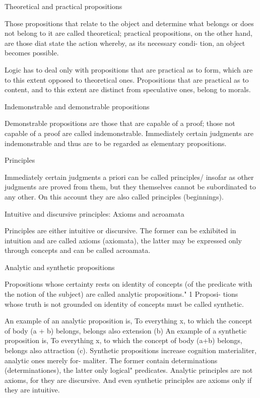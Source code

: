 Theoretical and practical propositions

Those propositions that relate to the object and determine what belongs
or does not belong to it are called theoretical; practical propositions, on the
other hand, are those diat state the action whereby, as its necessary condi-
tion, an object becomes possible.

    Logic has to deal only with propositions that are practical as to form, which
    are to this extent opposed to theoretical ones. Propositions that are practical
    as to content, and to this extent are distinct from speculative ones, belong to
    morals.

Indemonstrable and demonstrable propositions

Demonstrable propositions are those that are capable of a proof; those not
capable of a proof are called indemonstrable.
Immediately certain judgments are indemonstrable and thus are to be
regarded as elementary propositions.

Principles

Immediately certain judgments a priori can be called principles/ insofar as
other judgments are proved from them, but they themselves cannot be
subordinated to any other. On this account they are also called principles
(beginnings).

Intuitive and discursive principles: Axioms and acroamata

Principles are either intuitive or discursive. The former can be exhibited in
intuition and are called axioms (axiomata), the latter may be expressed only
through concepts and can be called acroamata.

Analytic and synthetic propositions

Propositions whose certainty rests on identity of concepts (of the predicate
with the notion of the subject) are called analytic propositions." 1 Proposi-
tions whose truth is not grounded on identity of concepts must be called
synthetic.

    An example of an analytic proposition is, To everything x, to which the
    concept of body (a + b) belongs, belongs also extension (b)
    An example of a synthetic proposition is, To everything x, to which the
    concept of body (a+b) belongs, belongs also attraction (c). Synthetic
    propositions increase cognition materialiter, analytic ones merely for-
    maliter. The former contain determinations (determinationes), the latter
    only logical" predicates.
    Analytic principles are not axioms, for they are discursive. And even
    synthetic principles are axioms only if they are intuitive.


